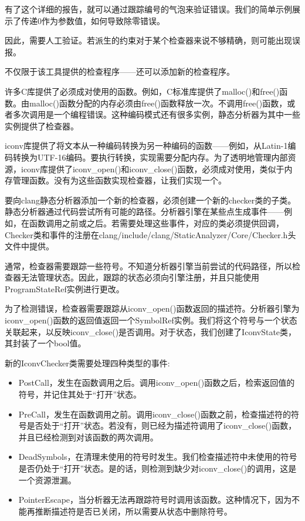 有了这个详细的报告，就可以通过跟踪编号的气泡来验证错误。我们的简单示例展示了传递0作为参数值，如何导致除零错误。

因此，需要人工验证。若派生的约束对于某个检查器来说不够精确，则可能出现误报。

不仅限于该工具提供的检查程序——还可以添加新的检查程序。


许多C库提供了必须成对使用的函数。例如，C标准库提供了malloc()和free()函数。由malloc()函数分配的内存必须由free()函数释放一次。不调用free()函数，或者多次调用是一个编程错误。这种编码模式还有很多实例，静态分析器为其中一些实例提供了检查器。

iconv库提供了将文本从一种编码转换为另一种编码的函数——例如，从Latin-1编码转换为UTF-16编码。要执行转换，实现需要分配内存。为了透明地管理内部资源，iconv库提供了iconv\_open()和iconv\_close()函数，必须成对使用，类似于内存管理函数。没有为这些函数实现检查器，让我们实现一个。

要向clang静态分析器添加一个新的检查器，必须创建一个新的checker类的子类。静态分析器通过代码尝试所有可能的路径。分析器引擎在某些点生成事件——例如，在函数调用之前或之后。若需要处理这些事件，对应的类必须提供回调，Checker类和事件的注册在clang/include/clang/StaticAnalyzer/Core/Checker.h头文件中提供。

通常，检查器需要跟踪一些符号。不知道分析器引擎当前尝试的代码路径，所以检查器无法管理状态。因此，跟踪的状态必须向引擎注册，并且只能使用ProgramStateRef实例进行更改。

为了检测错误，检查器需要跟踪从iconv\_open()函数返回的描述符。分析器引擎为iconv\_open()函数的返回值返回一个SymbolRef实例。我们将这个符号与一个状态关联起来，以反映iconv\_close()是否调用。对于状态，我们创建了IconvState类，其封装了一个bool值。

新的IconvChecker类需要处理四种类型的事件:

\begin{itemize}
\item
PostCall，发生在函数调用之后。调用iconv\_open()函数之后，检索返回值的符号，并记住其处于“打开”状态。

\item
PreCall，发生在函数调用之前。调用iconv\_close()函数之前，检查描述符的符号是否处于“打开”状态。若没有，则已经为描述符调用了iconv\_close()函数，并且已经检测到对该函数的两次调用。

\item
DeadSymbols，在清理未使用的符号时发生。我们检查描述符中未使用的符号是否仍处于“打开”状态。是的话，则检测到缺少对iconv\_close()的调用，这是一个资源泄漏。

\item
PointerEscape，当分析器无法再跟踪符号时调用该函数。这种情况下，因为不能再推断描述符是否已关闭，所以需要从状态中删除符号。
\end{itemize}


